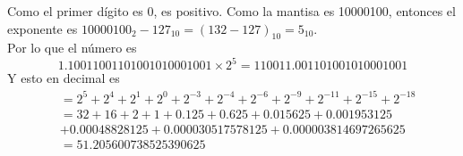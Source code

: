 \documentclass{article}
\begin{document}
\begin{enumerate}
{            Como el primer dígito es 0, es positivo. Como la mantisa es 
            10000100, entonces el exponente es $10000100_{2} -127_{10} 
            = (132 - 127)_{10} = 5_{10}$.\\
            Por lo que el número es
            \[1.10011001101001010001001 \times 2 ^ 5 = 110011.001101001010001001\]
            Y esto en decimal es
            \begin{align*}
                 &= 
                2^5 + 2^4 + 2^1 + 2^0 + 2^{-3} + 2^{-4} + 2^{-6} + 2^{-9} 
                + 2^{-11} + 2^{-15} + 2^{-18} \\
                &= 32 + 16 + 2 + 1 + 0.125 + 0.625 + 0.015625 + 0.001953125 \\ 
                &+ 0.00048828125 + 0.000030517578125 + 0.000003814697265625 \\
                &= 51.205600738525390625
            \end{align*}
            
}
\end{enumerate}
\end{document}
